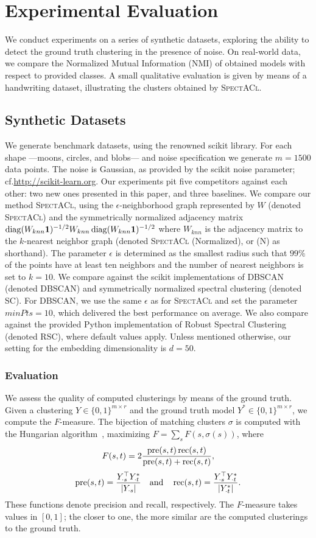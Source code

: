 \section{Experimental Evaluation}
We conduct experiments on a series of synthetic datasets, exploring the ability to detect the ground truth clustering in the presence of noise. On real-world data, we compare the Normalized Mutual Information (NMI) of obtained models with respect to provided classes. A small qualitative evaluation is given by means of a handwriting dataset, illustrating the clusters obtained by \textsc{SpectACl}. 
\subsection{Synthetic Datasets}
We generate benchmark datasets, using the renowned scikit library. For each shape ---moons, circles, and blobs--- and noise specification we generate $m=1500$ data points. The noise is Gaussian, as provided by the scikit noise parameter; cf.\@ \url{http://scikit-learn.org}. Our experiments pit five competitors against each other: two new ones presented in this paper, and three baselines.  
We compare our method \textsc{SpectACl}, using the $\epsilon$-neighborhood graph represented by $W$ (denoted \textsc{SpectACl}) and the symmetrically normalized adjacency matrix $\operatorname{diag}(W_{knn}\mathbf{1})^{-1/2}W_{knn}\operatorname{diag}(W_{knn}\mathbf{1})^{-1/2}$ where $W_{knn}$ is the adjacency matrix to the $k$-nearest neighbor graph (denoted \textsc{SpectACl} (Normalized), or (N) as shorthand). The parameter $\epsilon$ is determined as the smallest radius such that $99\%$ of the points have at least ten neighbors and the number of nearest neighbors is set to $k=10$. We compare against the scikit implementations of DBSCAN (denoted DBSCAN) and symmetrically normalized spectral clustering (denoted \textsc{SC}). For DBSCAN, we use the same $\epsilon$ as for \textsc{SpectACl} and set the parameter $minPts=10$, which delivered the best performance on average. We also compare against the provided Python implementation of Robust Spectral Clustering~\cite{bojchevski2017robust} (denoted \textsc{RSC}), where default values apply. Unless mentioned otherwise, our setting for the embedding dimensionality is $d=50$.
\subsubsection{Evaluation}
We assess the quality of computed clusterings by means of the ground truth. Given a clustering $Y\in\{0,1\}^{m\times r}$ and the ground truth model $Y^*\in\{0,1\}^{m\times r}$, we compute the $F$-measure. The bijection of matching clusters $\sigma$ is computed with the Hungarian algorithm~\cite{kuhn1955hungarian}, maximizing $F=\sum_s F(s,\sigma(s))$, where
\[F(s,t) = 2\frac{\operatorname*{pre}(s,t)\operatorname*{rec}(s,t)}{\operatorname*{pre}(s,t)+\operatorname*{rec}(s,t)},\]
$$
\operatorname*{pre}(s,t) = \frac{Y_{\cdot s}^\top Y^*_{\cdot t}}{|Y_{\cdot s}|} \quad\text{and}\quad \operatorname*{rec}(s,t) = \frac{Y_{\cdot s}^\top Y^*_{\cdot t}}{|Y^*_{\cdot t}|}.
$$
These functions denote precision and recall, respectively. The $F$-measure takes values in $[0,1]$; the closer to one, the more similar are the computed clusterings to the ground truth. 

